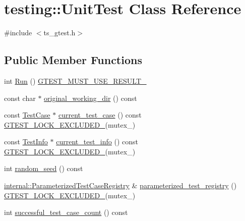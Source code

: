\hypertarget{classtesting_1_1UnitTest}{\section{testing\-:\-:Unit\-Test Class Reference}
\label{classtesting_1_1UnitTest}
}


{\ttfamily \#include $<$ts\-\_\-gtest.\-h$>$}

\subsection*{Public Member Functions}
\begin{DoxyCompactItemize}
\item 
int \hyperlink{classtesting_1_1UnitTest_a2febc800536b44500565f4c423f359d3}{Run} () \hyperlink{ts__gtest_8h_a8e5aab8276b2645f64f41c9e3021b935}{G\-T\-E\-S\-T\-\_\-\-M\-U\-S\-T\-\_\-\-U\-S\-E\-\_\-\-R\-E\-S\-U\-L\-T\-\_\-}
\item 
const char $\ast$ \hyperlink{classtesting_1_1UnitTest_adf043d0ac041bf2fd5dbae335e3d51a4}{original\-\_\-working\-\_\-dir} () const 
\item 
const \hyperlink{classtesting_1_1TestCase}{Test\-Case} $\ast$ \hyperlink{classtesting_1_1UnitTest_a158da6213cf0b2c6100e9cb1f8151e63}{current\-\_\-test\-\_\-case} () const \hyperlink{ts__gtest_8h_a69abff5a4efdd07bd5faebe3dd318d06}{G\-T\-E\-S\-T\-\_\-\-L\-O\-C\-K\-\_\-\-E\-X\-C\-L\-U\-D\-E\-D\-\_\-}(mutex\-\_\-)
\item 
const \hyperlink{classtesting_1_1TestInfo}{Test\-Info} $\ast$ \hyperlink{classtesting_1_1UnitTest_a02b6ab72bb9d93805bd0efbb099b4ccc}{current\-\_\-test\-\_\-info} () const \hyperlink{ts__gtest_8h_a69abff5a4efdd07bd5faebe3dd318d06}{G\-T\-E\-S\-T\-\_\-\-L\-O\-C\-K\-\_\-\-E\-X\-C\-L\-U\-D\-E\-D\-\_\-}(mutex\-\_\-)
\item 
int \hyperlink{classtesting_1_1UnitTest_a6fa3161a230329e07fc31a339b682a20}{random\-\_\-seed} () const 
\item 
\hyperlink{classtesting_1_1internal_1_1ParameterizedTestCaseRegistry}{internal\-::\-Parameterized\-Test\-Case\-Registry} \& \hyperlink{classtesting_1_1UnitTest_a1d9bd4ed86901c44b525a7b6ca4cbf3b}{parameterized\-\_\-test\-\_\-registry} () \hyperlink{ts__gtest_8h_a69abff5a4efdd07bd5faebe3dd318d06}{G\-T\-E\-S\-T\-\_\-\-L\-O\-C\-K\-\_\-\-E\-X\-C\-L\-U\-D\-E\-D\-\_\-}(mutex\-\_\-)
\item 
int \hyperlink{classtesting_1_1UnitTest_a1761c6274386032db8315156632eab6d}{successful\-\_\-test\-\_\-case\-\_\-count} () const 

\end{DoxyCompactItemize}
